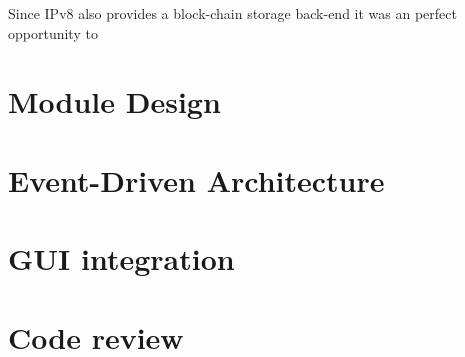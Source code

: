 Since IPv8 also provides a block-chain storage back-end it was an perfect opportunity to 

\section{Module Design}

\section{Event-Driven Architecture}

\section{GUI integration}

\section{Code review}
